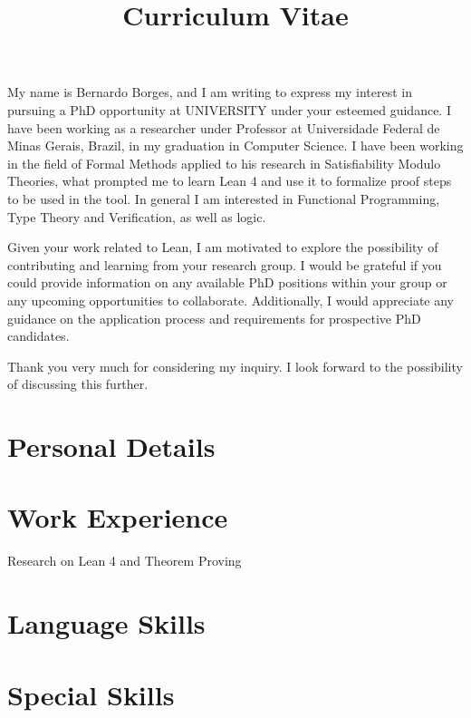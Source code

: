 \documentclass[a4paper]{moderncv}
\title{Curriculum Vitae}
\begin{document}
\makelettertitle
My name is Bernardo Borges, and I am writing to express my interest in pursuing a PhD opportunity at
UNIVERSITY under your esteemed guidance.
I have been working as a researcher under Professor 
at Universidade Federal de Minas Gerais, Brazil, in my graduation in Computer Science.
I have been working in the field of Formal Methods applied to his research in Satisfiability Modulo
Theories, what prompted me to learn Lean 4 and use it to formalize proof steps to be used in the
 tool.
In general I am interested in Functional Programming, Type Theory and Verification, as well as logic.

Given your work related to Lean, I am motivated to explore the possibility of contributing and learning
from your research group. I would be grateful if you could provide information on any available PhD
positions within your group or any upcoming opportunities to collaborate.
Additionally, I would appreciate any guidance on the application process and requirements for
prospective PhD candidates.

Thank you very much for considering my inquiry. I look forward to the possibility of discussing
this further.

\makeletterclosing

\newpage

\maketitle
\section{Personal Details}

\section{Work Experience}
{Research on Lean 4 and Theorem Proving}

\section{Language Skills}

\section{Special Skills}
\end{document}
